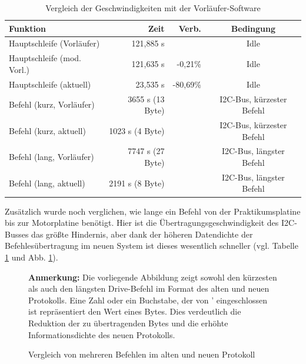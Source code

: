 \begin{table}[htb]
\begin{center}
	\begin{tabular}{|l||r|r|c|}
		\hline
		\textbf{Funktion} & \textbf{Zeit} & \textbf{Verb.} & \textbf{Bedingung} \\ \hline \hline
		Hauptschleife (Vorläufer) & 121,885 \textmu{}s & & Idle \\ \hline
		Hauptschleife (mod. Vorl.) & 121,635 \textmu{}s & -0,21\% & Idle \\ \hline
		Hauptschleife (aktuell) & 23,535 \textmu{}s & -80,69\% & Idle \\ \hline \hline
		Befehl (kurz, Vorläufer) & 3655 \textmu{}s (13 Byte) & & I2C-Bus, kürzester Befehl \\ \hline
		Befehl (kurz, aktuell) & 1023 \textmu{}s (4 Byte) & & I2C-Bus, kürzester Befehl \\ \hline
		Befehl (lang, Vorläufer) & 7747 \textmu{}s (27 Byte) & & I2C-Bus, längster Befehl \\ \hline
		Befehl (lang, aktuell) & 2191 \textmu{}s (8 Byte) & & I2C-Bus, längster Befehl \\ \hline
	\end{tabular}
	\caption{\label{vergl_speed} Vergleich der Geschwindigkeiten mit der Vorläufer-Software}
\end{center}
\end{table}
Zusätzlich wurde noch verglichen, wie lange ein Befehl von der Praktikumsplatine bis zur Motorplatine benötigt.
Hier ist die Übertragungsgeschwindigkeit des I2C-Busses das größte Hindernis, aber dank der höheren Datendichte
der Befehlesübertragung im neuen System ist dieses wesentlich schneller (vgl. Tabelle \ref{vergl_speed} und Abb.
 \ref{vergl_befehle}).
\begin{figure}[htb]
\begin{center}
 \caption{\label{vergl_befehle}Vergleich von mehreren Befehlen im alten und neuen Protokoll}
\end{center}
\textbf{Anmerkung:} Die vorliegende Abbildung zeigt sowohl den kürzesten als auch den längsten
Drive-Befehl im Format des alten und neuen Protokolls. Eine Zahl oder ein Buchstabe, der von ' eingeschlossen ist
repräsentiert den Wert eines Bytes. Dies verdeutlich die Reduktion der zu übertragenden Bytes
und die erhöhte Informationsdichte des neuen Protokolls.
\end{figure}
